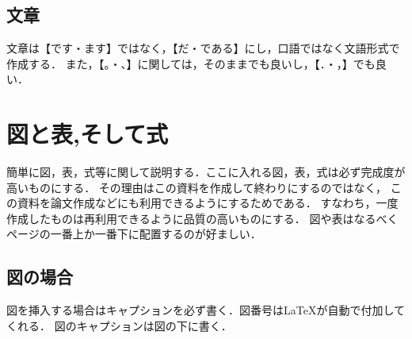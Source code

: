 \documentclass[11pt, a4paper]{jarticle}
\begin{document}
\subsection{文章}
文章は【です・ます】ではなく，【だ・である】にし，口語ではなく文語形式で作成する．
また，【。・、】に関しては，そのままでも良いし，【．・，】でも良い．

\section{図と表,そして式}
簡単に図，表，式等に関して説明する．ここに入れる図，表，式は必ず完成度が高いものにする．
その理由はこの資料を作成して終わりにするのではなく，
この資料を論文作成などにも利用できるようにするためである．
すなわち，一度作成したものは再利用できるように品質の高いものにする．
図や表はなるべくページの一番上か一番下に配置するのが好ましい．
\subsection{図の場合}
図を挿入する場合はキャプションを必ず書く．図番号は\LaTeX が自動で付加してくれる．
図のキャプションは図の下に書く．
\end{document}
